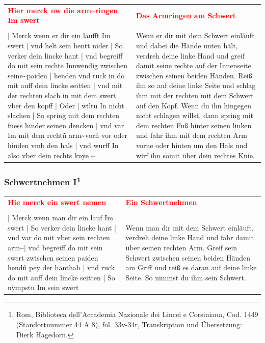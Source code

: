 \begin{longtable}{p{6.25cm}p{6.25cm}}
\textbf{\textcolor{red}{Hier merck nw die arm\textasciitilde  ringen Im swert}}
&
\textbf{\textcolor{red}{Das Armringen am Schwert}}
\\
\\
| Merck wenn er dir ein laufft Im swert | vnd helt sein hentt nider | So verker dein lincke hant | vnd begreiff do mit sein rechte Innwendig zwischen seine\textasciitilde  paiden | henden vnd ruck in do mit auff dein lincke seitten | vnd mit der rechten slach in mit dem swert vber den kopff | Oder | wiltu In nicht slachen | So spring mit dem rechten fuess hinder seinen dencken | vnd var Im mit dem rechtñ arm\textasciitilde  vorñ vor oder hinden vmb den hals | vnd wurff In also vber dein rechts knÿe \textasciitilde 
&
Wenn er dir mit dem Schwert einläuft und dabei die Hände unten hält, verdreh deine linke Hand und greif damit seine rechte auf der Innenseite zwischen seinen beiden Händen. Reiß ihn so auf deine linke Seite und schlag ihm mit der rechten mit dem Schwert auf den Kopf. Wenn du ihn hingegen nicht schlagen willst, dann spring mit dem rechten Fuß hinter seinen linken und fahr ihm mit dem rechten Arm vorne oder hinten um den Hals und wirf ihn somit über dein rechtes Knie.
\end{longtable}

\newpage

\begin{center}
\end{center}

\newpage

\subsubsection[Schwertnehmen I]{Schwertnehmen I\footnote{\hspace*{0.5ex}Rom, Biblioteca dell'Accademia Nazionale dei Lincei e Corsiniana, Cod. 1449 (Standortnummer 44 A 8), fol. 33v-34r, Transkription und Übersetzung: Dierk Hagedorn.}}

\begin{longtable}{p{6.25cm}p{6.25cm}}
\textbf{\textcolor{red}{Hie merck ein swert nemen}}
&
\textbf{\textcolor{red}{Ein Schwertnehmen}}
\\
\\
| Merck wenn man dir ein lauf Im swert | So verker dein lincke hant | vnd var do mit vber sein rechten arm\textasciitilde  | vnd begreiff do mit sein swert zwischen seinen paiden hendñ peÿ der hanthab | vnd ruck do mit auff dein lincke seitten | So nÿmpstu Im sein swert
&
Wenn man dir mit dem Schwert einläuft, verdreh deine linke Hand und fahr damit über seinen rechten Arm. Greif sein Schwert zwischen seinen beiden Händen am Griff und reiß es daran auf deine linke Seite. So nimmst du ihm sein Schwert.
\end{longtable}

